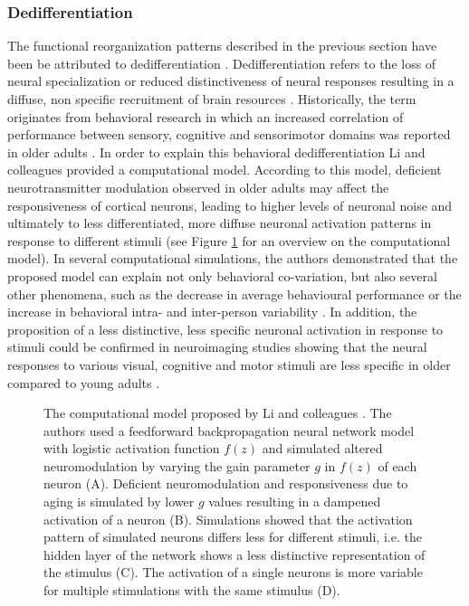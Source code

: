 \subsubsection{Dedifferentiation}
\label{theory:aging:dedif}
The functional reorganization patterns described in the previous section have been be attributed to dedifferentiation \cite{Grady2012}. Dedifferentiation refers to the loss of neural specialization or reduced distinctiveness of neural responses resulting in a diffuse, non specific recruitment of brain resources \cite{Koen2019}. Historically, the term originates from behavioral research in which an increased correlation of performance between sensory, cognitive and sensorimotor domains was reported in older adults \cite{Baltes1997,Li2002}. In order to explain this behavioral dedifferentiation Li and colleagues \cite{Li2001, Li2002} provided a computational model. According to this model, deficient neurotransmitter modulation observed in older adults may affect the responsiveness of cortical neurons, leading to higher levels of neuronal noise and ultimately to less differentiated, more diffuse neuronal activation patterns in response to different stimuli \cite{Li2001,Li2002} (see Figure \ref{fig:dedifferentiation} for an overview on the computational model). In several computational simulations, the authors demonstrated that the proposed model can explain not only behavioral co-variation, but also several other phenomena, such as the decrease in average behavioural performance or the increase in behavioral intra- and inter-person variability \cite{Li2000,Li2002}. In addition, the proposition of a less distinctive, less specific neuronal activation in response to stimuli could be confirmed in neuroimaging studies showing that the neural responses to various visual, cognitive and motor stimuli are less specific in older compared to young adults \cite{Tucker2019, Koen2019,Carb2011}. 

\begin{figure}[h]
\def\svgwidth{\columnwidth}

\caption[The computational model proposed by Li and colleagues \cite{Li2000,Li2002}]{The computational model proposed by Li and colleagues \cite{Li2000,Li2002}. The authors used a feedforward backpropagation neural network model with logistic activation function $f(z)$ and simulated altered neuromodulation by varying the gain parameter $g$ in $f(z)$ of each neuron (A). Deficient neuromodulation and responsiveness due to aging is simulated by lower $g$ values resulting in a dampened activation of a neuron (B). Simulations showed that the activation pattern of simulated neurons differs less for different stimuli, i.e. the hidden layer of the network shows a less distinctive representation of the stimulus (C). The activation of a single neurons is more variable for multiple stimulations with the same stimulus (D).}
\label{fig:dedifferentiation}
\end{figure}

